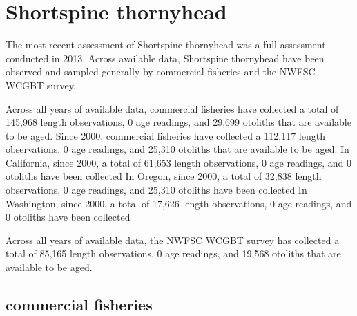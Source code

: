 \documentclass[11pt,
  english,
  letterpaper,
]{article}
\begin{document}

\hypertarget{shortspine-thornyhead}{%
\section{Shortspine thornyhead}\label{shortspine-thornyhead}}

\leavevmode\tagmcend\tagstructend


The most recent assessment of Shortspine thornyhead was a full assessment conducted in 2013. Across available data, Shortspine thornyhead have been observed and sampled generally by commercial fisheries and the NWFSC WCGBT survey.

\leavevmode\tagmcend\tagstructend\par


Across all years of available data, commercial fisheries have collected a total of 145,968 length observations, 0 age readings, and 29,699 otoliths that are available to be aged. Since 2000, commercial fisheries have collected a 112,117 length observations, 0 age readings, and 25,310 otoliths that are available to be aged. In California, since 2000, a total of 61,653 length observations, 0 age readings, and 0 otoliths have been collected In Oregon, since 2000, a total of 32,838 length observations, 0 age readings, and 25,310 otoliths have been collected In Washington, since 2000, a total of 17,626 length observations, 0 age readings, and 0 otoliths have been collected

\leavevmode\tagmcend\tagstructend\par


Across all years of available data, the NWFSC WCGBT survey has collected a total of 85,165 length observations, 0 age readings, and 19,568 otoliths that are available to be aged.

\leavevmode\tagmcend\tagstructend\par


\hypertarget{commercial-fisheries-48}{%
\subsection{commercial fisheries}\label{commercial-fisheries-48}}
\end{document}
